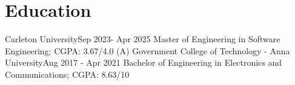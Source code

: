 \section{Education}
\resumeSubHeadingListStart
\resumeSubheading
{Carleton University}{Sep 2023- Apr 2025}
{Master of Engineering in Software Engineering; CGPA: 3.67/4.0 (A)}{}
\resumeSubheading
{Government College of Technology - Anna University}{Aug 2017 - Apr 2021}
{Bachelor of Engineering in Electronics and Communications; CGPA: 8.63/10}{}
\resumeSubHeadingListEnd
\vspace{5pt}

\vspace{-5pt}
